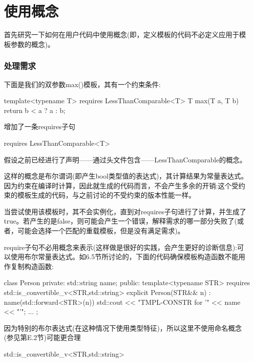 \section{使用概念}

首先研究一下如何在用户代码中使用概念(即，定义模板的代码不必定义应用于模板参数的概念)。

\subsubsection{处理需求}

下面是我们的双参数max()模板，其有一个约束条件:

\begin{cpp}
template<typename T> requires LessThanComparable<T>
T max(T a, T b) {
	return b < a ? a : b;
}
\end{cpp}

增加了一条requires子句

\begin{cpp}
requires LessThanComparable<T>
\end{cpp}

假设之前已经进行了声明——通过头文件包含——LessThanComparable的概念。

这样的概念是布尔谓词(即产生bool类型值的表达式)，其计算结果为常量表达式。因为约束在编译时计算，因此就生成的代码而言，不会产生多余的开销:这个受约束的模板生成的代码，与之前讨论的不受约束的版本性能一样。

当尝试使用该模板时，其不会实例化，直到对requires子句进行了计算，并生成了true。若产生的是false，则可能会产生一个错误，解释需求的哪一部分失败了(或者，可能会选择一个匹配的重载模板，但是没有满足需求)。

require子句不必用概念来表示(这样做是很好的实践，会产生更好的诊断信息):可以使用布尔常量表达式。如6.5节所讨论的，下面的代码确保模板构造函数不能用作复制构造函数:

\begin{cpp}
class Person
{
	private:
	std::string name;
	public:
	template<typename STR>
	requires std::is_convertible_v<STR,std::string>
	explicit Person(STR&& n)
	: name(std::forward<STR>(n)) {
		std::cout << "TMPL-CONSTR for '" << name << "'\n";
	}
	...
};
\end{cpp}

因为特别的布尔表达式(在这种情况下使用类型特征)，所以这里不使用命名概念(参见第E.2节)可能更合理

\begin{cpp}
std::is_convertible_v<STR,std::string>
\end{cpp}


